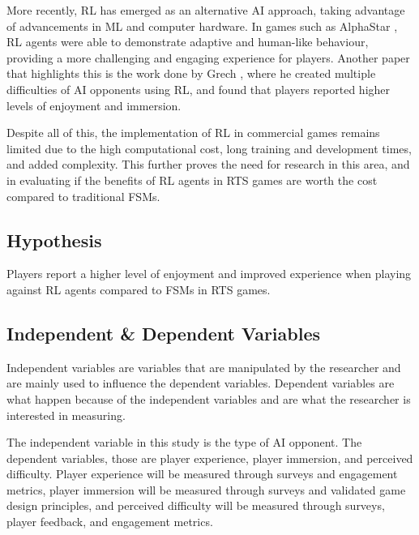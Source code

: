 \documentclass[conference]{IEEEtran}
\begin{document}
More recently, RL has emerged as an alternative AI approach, taking advantage of advancements in ML and computer hardware. In games such as AlphaStar \cite{vinyals_grandmaster_2019}, RL agents were able to
demonstrate adaptive and human-like behaviour, providing a more challenging and engaging experience for players. Another paper that highlights this is the work done by Grech \cite{grech_creating_2023},
where he created multiple difficulties of AI opponents using RL, and found that players reported higher levels of enjoyment and immersion. 

Despite all of this, the implementation of RL in commercial games remains limited due to the high computational cost, long training and development times, and added complexity.
This further proves the need for research in this area, and in evaluating if the benefits of RL agents in RTS games are worth the cost compared to traditional FSMs.

\subsection{Hypothesis}

Players report a higher level of enjoyment and improved experience when playing against RL agents compared to FSMs in RTS games.

\subsection{Independent \& Dependent Variables}

Independent variables are variables that are manipulated by the researcher and are mainly used to influence the dependent variables. 
Dependent variables are what happen because of the independent variables and are what the researcher is interested in measuring.

The independent variable in this study is the type of AI opponent. The dependent variables, those are player experience, player immersion, and perceived difficulty.
Player experience will be measured through surveys and engagement metrics, player immersion will be measured through surveys and validated game design principles, and perceived difficulty will be measured through
surveys, player feedback, and engagement metrics.
\end{document}
